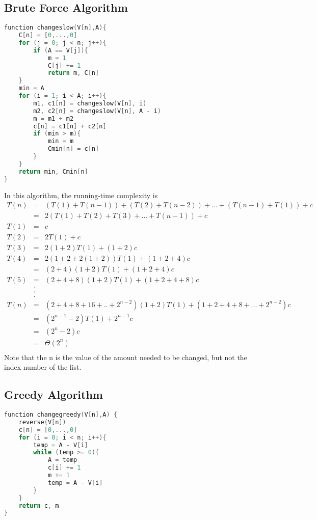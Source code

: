 \documentclass[11pt]{scrreprt}
\begin{document}
\subsection {Brute Force Algorithm}

\begin{lstlisting}[language=c]
function changeslow(V[n],A){
	C[n] = [0,...,0]
	for (j = 0; j < n; j++){
		if (A == V[j]){
			m = 1
			C[j] += 1
			return m, C[n]
	}
	min = A
	for (i = 1; i < A; i++){
		m1, c1[n] = changeslow(V[n], i)
		m2, c2[n] = changeslow(V[n], A - i)
		m = m1 + m2
		c[n] = c1[n] + c2[n]
		if (min > m){
			min = m
			Cmin[n] = c[n]
		}
	}
	return min, Cmin[n]
}
\end{lstlisting}
In this algorithm, the running-time complexity is
\begin{eqnarray*}
T(n) 	& = & (T(1)+ T(n-1)) + (T(2) + T(n-2)) + ... + (T(n-1) + T(1)) + c\\
		& = & 2(T(1) + T(2) + T(3) + ... + T(n-1)) + c\\
T(1)	& = & c\\
T(2) 	& = & 2T(1) + c\\
T(3) 	& = & 2(1+2)T(1) + (1+2)c\\
T(4) 	& = & 2(1+2+2(1+2))T(1) + (1+2+4)c\\
	 	& = & (2+4)(1+2)T(1) + (1+2+4)c\\
T(5) 	& = & (2+4+8)(1+2)T(1) + (1+2+4+8)c\\
		& . & \\
		& . & \\
		& . & \\
T(n) 	& = & (2+4+8+16+..+2^{n-2})(1+2)T(1) + (1+2+4+8+...+2^{n-2})c\\
		& = & (2^{n-1}-2)T(1) + 2^{n-1}c\\
		& = & (2^n-2)c\\
		& = & \Theta(2^n)\\
\end{eqnarray*}
Note that the n is the value of the amount needed to be changed, but not the index number of the list.



\subsection{Greedy Algorithm}

\begin{lstlisting}[language=c]
function changegreedy(V[n],A) {
	reverse(V[n])
	c[n] = [0,...,0]
	for (i = 0; i < n; i++){
		temp = A - V[i]
		while (temp >= 0){
		    A = temp
		    c[i] += 1
		    m += 1
		    temp = A - V[i]
		}
	}
	return c, m
}
\end{lstlisting}
\end{document}
